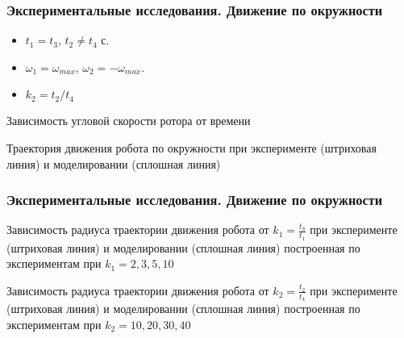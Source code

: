 \begin{frame}
\frametitle{Экспериментальные исследования. Движение по окружности}
\begin{itemize}
	\item $t_1 = t_3$, $t_2 \neq t_4$ с.
	\item $ \omega_1 = \omega_{max} $, $ \omega_2 = -\omega_{max} $. 
	\item $ k_2 = t_2 / t_4 $
\end{itemize}

\begin{minipage}[t]{0.47\linewidth}
	{Зависимость угловой скорости ротора от времени \\}
\end{minipage}
\hfill
\begin{minipage}[t]{0.47\linewidth}
	{Траектория движения робота по окружности при эксперименте (штриховая линия) и моделировании (сплошная линия)}
\end{minipage}

\end{frame}

\begin{frame}
\frametitle{Экспериментальные исследования. Движение по окружности}


\begin{minipage}[t]{0.47\linewidth}
	{Зависимость радиуса траектории движения робота от $k_1 = \frac{t_3}{t_1}$ при эксперименте (штриховая линия) и моделировании (сплошная линия) построенная по экспериментам при $k_1 = 2, 3, 5, 10$}
	\center{\texttt{[image: kRDependence+Theor\_T=3,W=max.eps]}}
\end{minipage}
\hfill
\begin{minipage}[t]{0.47\linewidth}
	{Зависимость радиуса траектории движения робота от $k_2 = \frac{t_2}{t_4}$ при эксперименте (штриховая линия) и моделировании (сплошная линия) построенная по экспериментам при $k_2 = 10, 20, 30, 40$}
\end{minipage}

\end{frame}

